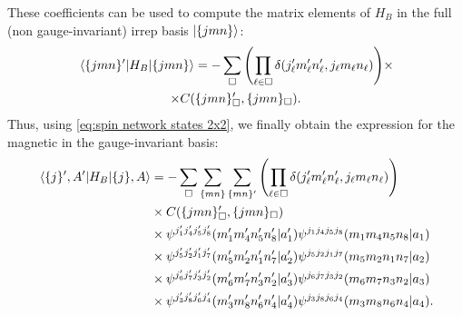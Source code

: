 These coefficients can be used to compute the matrix elements of $H_B$ in the full (non gauge-invariant) \ac{irrep} basis $\ket{ \{jmn\} }$:
\begin{multline}
    \mel{ \{jmn\}^{\prime} }{H_B}{ \{jmn\} } =
    - \sum_{\square}
        \qty(
            \prod_{\ell \in \square} \delta( j_{\ell}^{\prime} m_{\ell}^{\prime} n_{\ell}^{\prime}, j_{\ell} m_{\ell} n_{\ell} )
        ) \times \\
        \times C( \{jmn\}_{\square}^{\prime}, \{jmn\}_{\square}).
\end{multline}
Thus, using \eqref{eq:spin network states 2x2}, we finally obtain the expression for the magnetic in the gauge-invariant basis:
\begin{equation}
    \begin{split}
        \mel{ \{j\}^{\prime}, A^{\prime}}{H_B}{ \{j\}, A} & =
        - \sum_{\square} \sum_{ \{mn\} } \sum_{ \{mn\}^{\prime} }
            \qty(
                \prod_{\ell \in \square} \delta( j_{\ell}^{\prime} m_{\ell}^{\prime} n_{\ell}^{\prime}, j_{\ell} m_{\ell} n_{\ell} )
            ) \\
            & \times C( \{jmn\}_{\square}^{\prime}, \{jmn\}_{\square}) \\
            & \times \psi^{ j_{1}^\prime j_{4}^\prime j_{5}^\prime j_{8}^\prime }( m_{1}^\prime m_{4}^\prime n_{5}^\prime n_{8}^\prime | a_{1}^\prime ) \psi^{ j_{1} j_{4} j_{5} j_{8} }( m_{1} m_{4} n_{5} n_{8} | a_{1} ) \\
            & \times \psi^{ j_{5}^\prime j_{2}^\prime j_{1}^\prime j_{7}^\prime }( m_{5}^\prime m_{2}^\prime n_{1}^\prime n_{7}^\prime | a_{2}^\prime ) \psi^{ j_{5} j_{2} j_{1} j_{7} }( m_{5} m_{2} n_{1} n_{7} | a_{2} ) \\
            & \times \psi^{ j_{6}^\prime j_{7}^\prime j_{3}^\prime j_{2}^\prime }( m_{6}^\prime m_{7}^\prime n_{3}^\prime n_{2}^\prime | a_{3}^\prime ) \psi^{ j_{6} j_{7} j_{3} j_{2} }( m_{6} m_{7} n_{3} n_{2} | a_{3} ) \\
            & \times \psi^{ j_{3}^\prime j_{8}^\prime j_{6}^\prime j_{4}^\prime }( m_{3}^\prime m_{8}^\prime n_{6}^\prime n_{4}^\prime | a_{4}^\prime ) \psi^{ j_{3} j_{8} j_{6} j_{4} }( m_{3} m_{8} n_{6} n_{4} | a_{4} ).
    \end{split}
    \label{eq:explicit_magn_Hamiltonian}
\end{equation}


